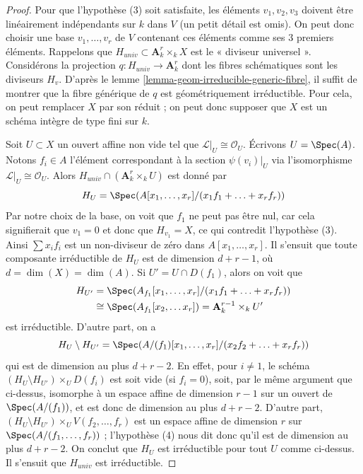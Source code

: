 \begin{proof}
Pour que l'hypothèse (3) soit satisfaite, les éléments $v_1, v_2, v_3$
doivent être linéairement indépendants sur $k$ dans $V$ (un petit détail est omis).
On peut donc choisir une base $v_1, \ldots, v_r$ de $V$ contenant
ces éléments comme ses $3$ premiers éléments. Rappelons que
$H_{univ} \subset \mathbf{A}^r_k \times_k X$ est le « diviseur universel ».
Considérons la projection $q : H_{univ} \to \mathbf{A}^r_k$
dont les fibres schématiques sont les diviseurs $H_v$. D'après le
lemme \ref{lemma-geom-irreducible-generic-fibre},
il suffit de montrer que la fibre générique de $q$ est géométriquement
irréductible.
Pour cela, on peut remplacer $X$ par son réduit ; on peut donc
supposer que $X$ est un schéma intègre de type fini sur $k$.

\medskip\noindent
Soit $U \subset X$ un ouvert affine non vide tel que
$\mathcal{L}|_U \cong \mathcal{O}_U$. Écrivons $U = \Spec(A)$.
Notons $f_i \in A$ l'élément correspondant à la section $\psi(v_i)|_U$
via l'isomorphisme $\mathcal{L}|_U \cong \mathcal{O}_U$.
Alors $H_{univ} \cap (\mathbf{A}^r_k \times_k U)$ est donné par
$$
H_U = \Spec(A[x_1, \ldots, x_r]/(x_1f_1 + \ldots + x_rf_r))
$$
Par notre choix de la base, on voit que $f_1$ ne peut pas être nul, car cela
signifierait que $v_1 = 0$ et donc que $H_{v_1} = X$, ce qui contredit
l'hypothèse (3). Ainsi $\sum x_if_i$ est un non-diviseur de zéro dans
$A[x_1, \ldots, x_r]$.
Il s'ensuit que toute composante irréductible de $H_U$ est de dimension
$d + r - 1$, où $d = \dim(X) = \dim(A)$. Si $U' = U \cap D(f_1)$,
alors on voit que
$$
\begin{aligned}
H_{U'} &= \Spec(A_{f_1}[x_1, \ldots, x_r]/(x_1f_1 + \ldots + x_rf_r)) \\
&\cong \Spec(A_{f_1}[x_2, \ldots x_r]) = \mathbf{A}^{r - 1}_k \times_k U'
\end{aligned}
$$
est irréductible. D'autre part, on a
$$
H_U \setminus H_{U'} =
\Spec(A/(f_1)[x_1, \ldots, x_r]/(x_2f_2 + \ldots + x_rf_r))
$$
qui est de dimension au plus $d + r - 2$. En effet, pour $i \not = 1$,
le schéma $(H_U \setminus H_{U'}) \times_U D(f_i)$ est soit vide
(si $f_i = 0$), soit, par le même argument que ci-dessus, isomorphe à un espace affine de dimension $r - 1$
sur un ouvert de $\Spec(A/(f_1))$, et est donc de
dimension au plus $d + r - 2$.
D'autre part, $(H_U \setminus H_{U'}) \times_U V(f_2, \ldots, f_r)$
est un espace affine de dimension $r$ sur $\Spec(A/(f_1, \ldots, f_r))$ ;
l'hypothèse (4) nous dit donc qu'il est de dimension au plus
$d + r - 2$. On conclut que $H_U$ est irréductible pour tout $U$ comme ci-dessus.
Il s'ensuit que $H_{univ}$ est irréductible.


\end{proof}
